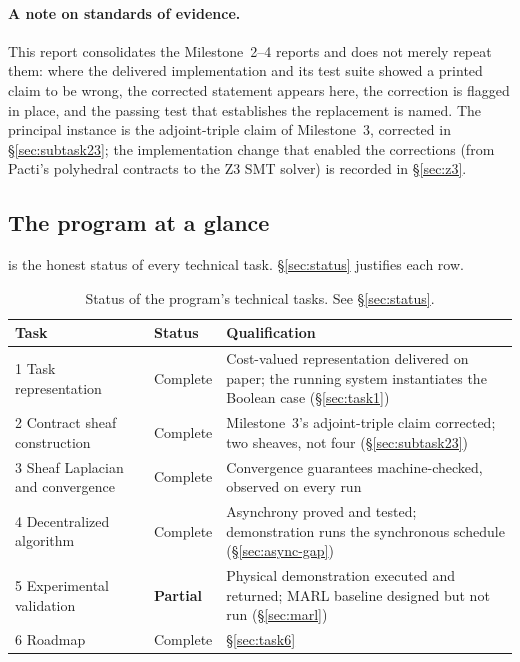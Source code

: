 \documentclass[11pt]{article}
\theoremstyle{definition}
\theoremstyle{remark}
\begin{document}
\paragraph{A note on standards of evidence.}
This report consolidates the Milestone~2--4 reports and does not merely repeat them: where the
delivered implementation and its test suite showed a printed claim to be wrong, the corrected
statement appears here, the correction is flagged in place, and the passing test that
establishes the replacement is named.
The principal instance is the adjoint-triple claim of Milestone~3, corrected in
\S\ref{sec:subtask23}; the implementation change that enabled the corrections (from Pacti's
polyhedral contracts to the Z3 SMT solver) is recorded in \S\ref{sec:z3}.

\subsection{The program at a glance}
\label{sec:glance}

 is the honest status of every technical task.
\S\ref{sec:status} justifies each row.

\begin{table}[h]
\centering
\small
\begin{tabular}{@{}llp{}@{}}
\toprule
\textbf{Task} & \textbf{Status} & \textbf{Qualification} \\
\midrule
1 Task representation                  & Complete & Cost-valued representation delivered on paper; the running system instantiates the Boolean case (\S\ref{sec:task1}) \\
2 Contract sheaf construction          & Complete & Milestone~3's adjoint-triple claim corrected; two sheaves, not four (\S\ref{sec:subtask23}) \\
3 Sheaf Laplacian and convergence      & Complete & Convergence guarantees machine-checked, observed on every run \\
4 Decentralized algorithm              & Complete & Asynchrony proved and tested; demonstration runs the synchronous schedule (\S\ref{sec:async-gap}) \\
5 Experimental validation              & \textbf{Partial} & Physical demonstration executed and returned; MARL baseline designed but not run (\S\ref{sec:marl}) \\
6 Roadmap                              & Complete & \S\ref{sec:task6} \\
\bottomrule
\end{tabular}
\caption{Status of the program's technical tasks. See \S\ref{sec:status}.}
\label{tab:status}
\end{table}
\end{document}
